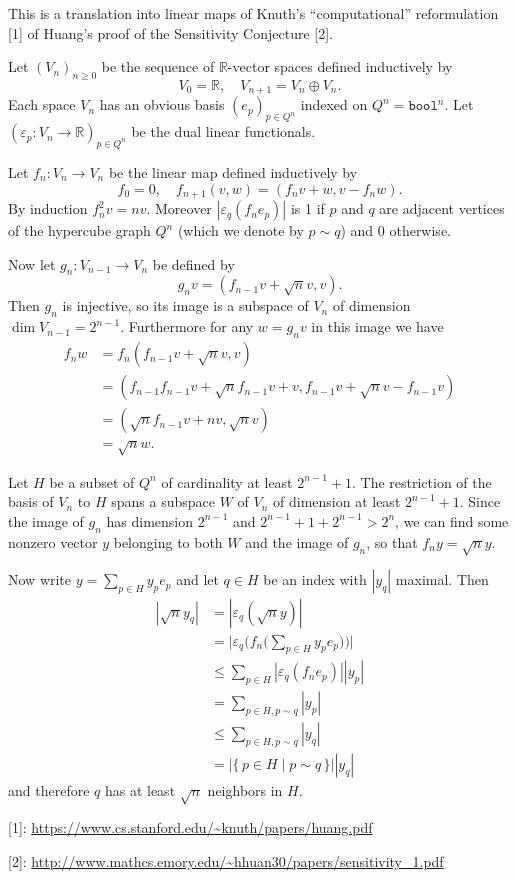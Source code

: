 \documentclass[11pt]{article}
\newcommand{\RR}{\mathbb{R}}
\newcommand{\bool}{\mathtt{bool}}
\begin{document}
This is a translation into linear maps of Knuth's ``computational'' reformulation [1] of Huang's proof of the Sensitivity Conjecture [2].

\medskip

Let $(V_n)_{n \ge 0}$ be the sequence of $\RR$-vector spaces defined inductively by
\[
  V_0 = \RR, \quad V_{n+1} = V_n \oplus V_n.
\]
Each space $V_n$ has an obvious basis $(e_p)_{p \in Q^n}$ indexed on $Q^n = \bool^n$.
Let $(\varepsilon_p : V_n \to \RR)_{p \in Q^n}$ be the dual linear functionals.

Let $f_n : V_n \to V_n$ be the linear map defined inductively by
\[
  f_0 = 0, \quad f_{n+1}(v, w) = (f_n v + w, v - f_n w).
\]
By induction $f_n^2 v = n v$.
Moreover $|\varepsilon_q (f_n e_p)|$ is 1 if $p$ and $q$ are adjacent vertices of the hypercube graph $Q^n$ (which we denote by $p \sim q$) and 0 otherwise.

Now let $g_n : V_{n-1} \to V_n$ be defined by
\[
  g_n v = (f_{n-1} v + \sqrt n v, v).
\]
Then $g_n$ is injective, so its image is a subspace of $V_n$ of dimension $\dim V_{n-1} = 2^{n-1}$.
Furthermore for any $w = g_n v$ in this image we have
\begin{align*}
  f_n w
  & = f_n (f_{n-1} v + \sqrt n v, v) \\
  & = (f_{n-1} f_{n-1} v + \sqrt n f_{n-1} v + v, f_{n-1} v + \sqrt n v - f_{n-1} v) \\
  & = (\sqrt n f_{n-1} v + n v, \sqrt n v) \\
  & = \sqrt n w.
\end{align*}

Let $H$ be a subset of $Q^n$ of cardinality at least $2^{n-1} + 1$.
The restriction of the basis of $V_n$ to $H$ spans a subspace $W$ of $V_n$ of dimension at least $2^{n-1} + 1$.
Since the image of $g_n$ has dimension $2^{n-1}$ and $2^{n-1} + 1 + 2^{n-1} > 2^n$, we can find some nonzero vector $y$ belonging to both $W$ and the image of $g_n$, so that $f_n y = \sqrt n y$.

Now write $y = \sum_{p \in H} y_p e_p$ and let $q \in H$ be an index with $|y_q|$ maximal.
Then
\begin{align*}
  |\sqrt n y_q|
  & = |\varepsilon_q (\sqrt n y)| \\
  & = \big|\varepsilon_q \big(f_n \big(\sum_{p \in H} y_p e_p \big)\big)\big| \\
  & \le \sum_{p \in H} |\varepsilon_q (f_n e_p)| |y_p| \\
  & = \sum_{p \in H, p \sim q} |y_p| \\
  & \le \sum_{p \in H, p \sim q} |y_q| \\
  & = |\{\,p \in H \mid p \sim q\,\}| |y_q|
\end{align*}
and therefore $q$ has at least $\sqrt n$ neighbors in $H$.

\medskip

[1]: \url{https://www.cs.stanford.edu/~knuth/papers/huang.pdf}

[2]: \url{http://www.mathcs.emory.edu/~hhuan30/papers/sensitivity_1.pdf}
\end{document}
